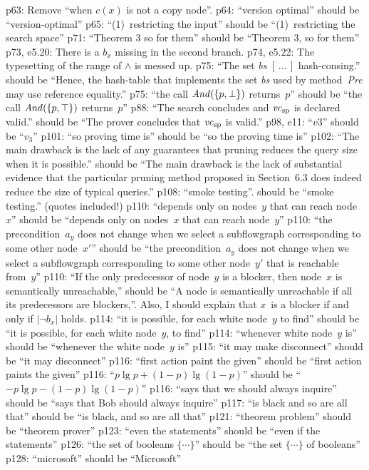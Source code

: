 \e p63: Remove ``when $c(x)$ is not a copy node''.
\e p64: ``version optimal'' should be ``version-optimal''
\e p65: ``(1)~restricting the input'' should be ``(1)~restricting the
  search space''
\e p71: ``Theorem 3 so for them'' should be ``Theorem 3, so for them''
\e p73, e5.20: There is a $b_x$ missing in the second branch.
\e p74, e5.22: The typesetting of the range of $\land$ is messed up.
\e p75: ``The set {\it bs\/} $[\,\ldots\,]$ hash-consing.'' should be ``Hence, the
  hash-table that implements the set {\it bs\/} used by method~{\it Pre} may
  use reference equality.''
\e p75: ``the call ${\it And}(\{p,\bot\})$ returns~$p$'' should be
  ``the call ${\it And}(\{p,\top\})$ returns~$p$''
\e p88: ``The search concludes and ${\it vc}_{\rm sp}$ is declared valid.''
  should be ``The prover concludes that ${\it vc}_{\rm sp}$ is valid.''
\e p98, e11: ``$v3$'' should be ``$v_3$''
\e p101: ``so proving time is'' should be ``so the proving time is'' 
\e p102: ``The main drawback is the lack of any guarantees that pruning
  reduces the query size when it is possible.'' should be ``The main
  drawback is the lack of substantial evidence that the particular 
  pruning method proposed in Section~6.3 does indeed reduce the size
  of typical queries.''
\e p108: ``smoke testing''. should be ``smoke testing.'' (quotes included!)
\e p110: ``depends only on nodes~$y$ that can reach node~$x$'' should be
  ``depends only on nodes~$x$ that can reach node~$y$''
\e p110: ``the precondition~$a_y$ does not change when we select a
  subflowgraph corresponding to some other node~$x'$'' should be
  ``the precondition~$a_y$ does not change when we select a subflowgraph
  corresponding to some other node~$y'$ that is reachable from~$y$''
\e p110: ``If the only predecessor of node~$y$ is a blocker, then node~$x$
  is semantically unreachable,'' should be ``A node is semantically
  unreachable if all its predecessors are blockers,''. Also, I should
  explain that $x$~is a blocker if and only if $|\lnot b_x|$ holds.
\e p114: ``it is possible, for each white node~$y$ to find'' should be
  ``it is possible, for each white node~$y$, to find''
\e p114: ``whenever white node~$y$ is'' should be ``whenever the white
  node~$y$ is''
\e p115: ``it may make disconnect'' should be ``it may disconnect''
\e p116: ``first action paint the given'' should be ``first action paints
  the given''
\e p116: ``$p\lg p+(1-p)\lg(1-p)$'' should be ``$-p\lg p-(1-p)\lg(1-p)$''
\e p116: ``says that we should always inquire'' should be ``says that Bob
  should always inquire''
\e p117: ``is black and so are all that'' should be ``is black, and so are 
  all that''
\e p121: ``theorem problem'' should be ``theorem prover''
\e p123: ``even the statements'' should be ``even if the statements''
\e p126: ``the set of booleans $\{\cdots\}$'' should be ``the set $\{\cdots\}$
  of booleans''
\e p128: ``microsoft'' should be ``Microsoft''

\bye
